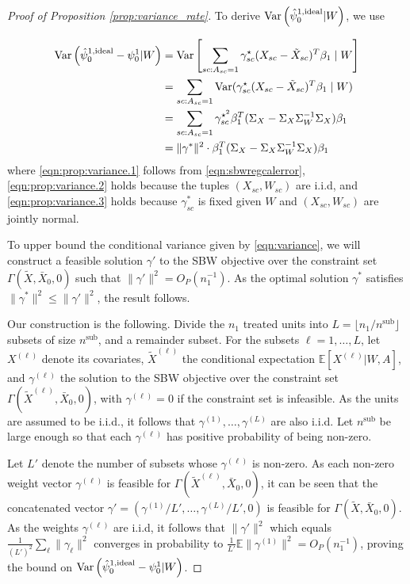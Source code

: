 \documentclass[aoas]{imsart}
\theoremstyle{plain}
\theoremstyle{remark}
\begin{document}
\begin{appendix}
\begin{proof}[Proof of Proposition \ref{prop:variance_rate}] 
To derive $\operatorname{Var}\left(\hat{\psi}_0^{1,\textup{ideal}} | W\right)$, we use

\begin{align}
\operatorname{Var}\left(\hat{\psi}_0^{1,\textup{ideal}} - \psi_0^1 | W\right) &= \operatorname{Var}\left[\sum_{sc: A_{sc} = 1}\gamma_{sc}^\star(X_{sc} - \tilde{X}_{sc})^T\beta_1 \mid W\right] \label{eqn:prop:variance.1}\\
 &= \sum_{sc: A_{sc} = 1} \operatorname{Var}(\gamma_{sc}^\star(X_{sc} - \tilde{X}_{sc})^T\beta_1 \mid W) \label{eqn:prop:variance.2}\\
 &= \sum_{sc: A_{sc} = 1} \gamma_{sc}^{\star^2}\beta_1^T(\Sigma_{X} - \Sigma_{X}\Sigma_{W}^{-1}\Sigma_{X})\beta_1  \label{eqn:prop:variance.3}\\
& = \|\gamma^*\|^2 \cdot \beta_1^T(\Sigma_{X} - \Sigma_{X}\Sigma_{W}^{-1}\Sigma_{X})\beta_1 \label{eqn:variance}
\end{align}
%
where \eqref{eqn:prop:variance.1} follows from \eqref{eqn:sbwregcalerror}, \eqref{eqn:prop:variance.2} holds because the tuples $(X_{sc}, W_{sc})$ are i.i.d, and \eqref{eqn:prop:variance.3} holds because $\gamma_{sc}^*$ is fixed given $W$ and $(X_{sc}, W_{sc})$ are jointly normal. 

To upper bound the conditional variance given by \eqref{eqn:variance}, we will construct a feasible solution $\gamma'$ to the SBW objective over the constraint set $\Gamma(\tilde{X}, \bar{X}_0, 0)$ such that $\|\gamma'\|^2 = O_P(n_1^{-1})$. As the optimal solution $\gamma^*$ satisfies $\|\gamma^*\|^2 \leq \|\gamma'\|^2$, the result follows.

Our construction is the following. Divide the $n_1$ treated units into $L = \lfloor n_1/n^{\text{sub}} \rfloor$ subsets of size $n^{\text{sub}}$, and a remainder subset. For the subsets $\ell=1,\ldots,L$, let $X^{(\ell)}$ denote its covariates, $\tilde{X}^{(\ell)}$ the conditional expectation $\mathbb{E}[X^{(\ell)}|W, A]$, and  $\gamma^{(\ell)}$ the solution to the SBW objective over the constraint set $\Gamma(\tilde{X}^{(\ell)}, \bar{X}_0, 0)$, with $\gamma^{(\ell)}=0$ if the constraint set is infeasible. As the units are assumed to be i.i.d., it follows that $\gamma^{(1)}, \ldots, \gamma^{(L)}$ are also i.i.d. Let $n^{\text{sub}}$ be large enough so that each $\gamma^{(\ell)}$ has positive probability of being non-zero. 

Let $L'$ denote the number of subsets whose $\gamma^{(\ell)}$ is non-zero. As each non-zero weight vector $\gamma^{(\ell)}$ is feasible for $\Gamma(\tilde{X}^{(\ell)}, \bar{X}_0, 0)$, it can be seen that the concatenated vector $\gamma' = (\gamma^{(1)}/L', \ldots, \gamma^{(L)}/L', 0)$ is feasible for $\Gamma(\tilde{X},\bar{X}_0,0)$. As the weights $\gamma^{(\ell)}$ are i.i.d, it follows that $\| \gamma'\|^2$ which equals $\frac{1}{(L')^2} \sum_\ell \|\gamma_\ell\|^2$  converges in probability to $\frac{1}{L'} \mathbb{E}\|\gamma^{(1)}\|^2 = O_P(n_1^{-1})$, proving the bound on $\operatorname{Var}\left(\hat{\psi}_0^{1,\textup{ideal}} - \psi_0^1 | W\right)$.


\end{proof}
\end{appendix}
\end{document}
